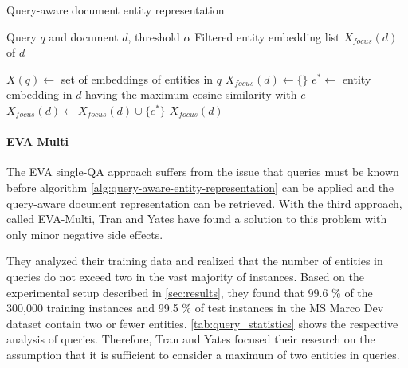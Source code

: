 \begin{algorithm}[!htb]
    \caption{Query-aware document entity representation}
    \label{alg:query-aware-entity-representation}
    \begin{algorithmic}[1]
    \REQUIRE Query $q$ and document $d$, threshold $\alpha$
    \ENSURE Filtered entity embedding list $X_{focus}(d)$ of $d$
    
    \STATE $X(q) \leftarrow$ set of embeddings of entities in $q$
    \STATE $X_{focus}(d) \leftarrow \{\}$
        \STATE $e^* \leftarrow$ entity embedding in $d$ having the maximum cosine similarity with $e$
            \STATE $X_{focus}(d) \leftarrow X_{focus}(d) \cup \{e^*\}$
        \ENDIF
    \ENDFOR
    \RETURN $X_{focus}(d)$
    \end{algorithmic}
\end{algorithm}

\paragraph*{EVA Multi}

The EVA single-QA approach suffers from the issue that queries must be known before algorithm \ref{alg:query-aware-entity-representation} can be applied and the query-aware document representation can be retrieved. With the third approach, called EVA-Multi, Tran and Yates have found a solution to this problem with only minor negative side effects.

They analyzed their training data and realized that the number of entities in queries do not exceed two in the vast majority of instances. Based on the experimental setup described in \autoref{sec:results}, they found that 99.6 \% of the 300,000 training instances and 99.5 \% of test instances in the MS Marco Dev dataset contain two or fewer entities. \autoref{tab:query_statistics} shows the respective analysis of queries. Therefore, Tran and Yates focused their research on the assumption that it is sufficient to consider a maximum of two entities in queries.

